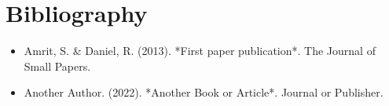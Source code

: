 \chapter*{Bibliography}

\begin{itemize}
  \item {Amrit, S. \& Daniel, R. (2013). *First paper publication*. The Journal of Small Papers.}
  \item {Another Author. (2022). *Another Book or Article*. Journal or Publisher.}
\end{itemize}
